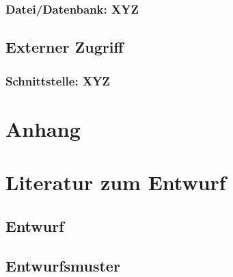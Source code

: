 \documentclass[a4paper,12pt]{scrartcl}
\begin{document}
\subsubsection{Datei/Datenbank: XYZ}
\subsection{Externer Zugriff}
\subsubsection{Schnittstelle: XYZ}

\appendix%

\section{Anhang}

\section{Literatur zum Entwurf}
\subsection{Entwurf}
\subsection{Entwurfsmuster}
\end{document}
